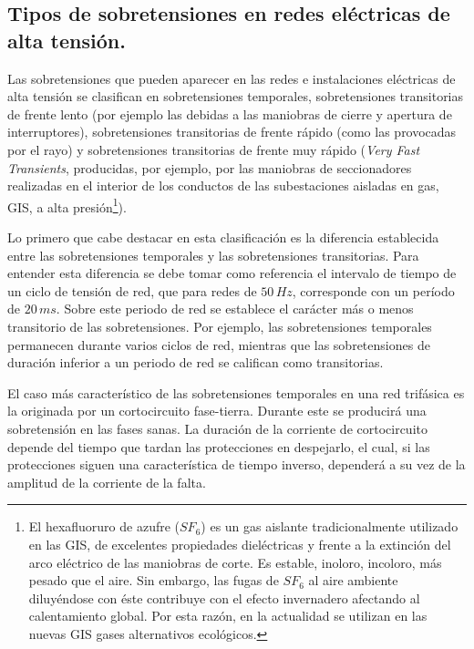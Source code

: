         \subsection{Tipos de sobretensiones en redes eléctricas de alta tensión.}
            Las sobretensiones que pueden aparecer en las redes e instalaciones eléctricas de alta tensión se clasifican en sobretensiones temporales, sobretensiones transitorias de frente lento (por ejemplo las debidas a las maniobras de cierre y apertura de interruptores), sobretensiones transitorias de frente rápido (como las provocadas por el rayo) y sobretensiones transitorias de frente muy rápido (\textit{Very Fast Transients}, producidas, por ejemplo, por las maniobras de seccionadores realizadas en el interior de los conductos de las subestaciones aisladas en gas, GIS, a alta presión\footnote{El hexafluoruro de azufre ($\textit{SF}_6$) es un gas aislante tradicionalmente utilizado en las GIS, de excelentes propiedades dieléctricas y frente a la extinción del arco eléctrico de las maniobras de corte. Es estable, inoloro, incoloro, más pesado que el aire. Sin embargo, las fugas de $\textit{SF}_6$ al aire ambiente diluyéndose con éste contribuye con el efecto invernadero afectando al calentamiento global. Por esta razón, en la actualidad se utilizan en las nuevas GIS gases alternativos ecológicos.}).\newline

            Lo primero que cabe destacar en esta clasificación es la diferencia establecida entre las sobretensiones temporales y las sobretensiones transitorias. Para entender esta diferencia se debe tomar como referencia el intervalo de tiempo de un ciclo de tensión de red, que para redes de $50\,\textit{Hz}$, corresponde con un período de $20\,\textit{ms}$. Sobre este periodo de red se establece el carácter más o menos transitorio de las sobretensiones. Por ejemplo, las sobretensiones temporales permanecen durante varios ciclos de red, mientras que las sobretensiones de duración inferior a un periodo de red se califican como transitorias.\newline

            El caso más característico de las sobretensiones temporales en una red trifásica es la originada por un cortocircuito fase-tierra. Durante este se producirá una sobretensión en las fases sanas. La duración de la corriente de cortocircuito depende del tiempo que tardan las protecciones en despejarlo, el cual, si las protecciones siguen una característica de tiempo inverso, dependerá a su vez de la amplitud de la corriente de la falta.\newline
            
